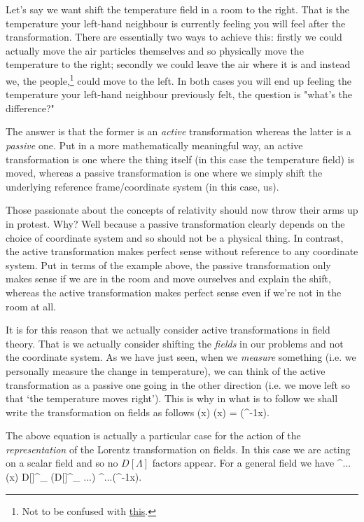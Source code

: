 Let's say we want shift the temperature field in a room to the right. That is the temperature your left-hand neighbour is currently feeling you will feel after the transformation. There are essentially two ways to achieve this: firstly we could actually move the air particles themselves and so physically move the temperature to the right; secondly we could leave the air where it is and instead we, the people,\footnote{Not to be confused with \href{https://en.wikipedia.org/wiki/We_the_People_(disambiguation)}{this}.} could move to the left. In both cases you will end up feeling the temperature your left-hand neighbour previously felt, the question is "what's the difference?" 

The answer is that the former is an \textit{active} transformation whereas the latter is a \textit{passive} one. Put in a more mathematically meaningful way, an active transformation is one where the thing itself (in this case the temperature field) is moved, whereas a passive transformation is one where we simply shift the underlying reference frame/coordinate system (in this case, us). 

Those passionate about the concepts of relativity should now throw their arms up in protest. Why? Well because a passive transformation clearly depends on the choice of coordinate system and so should not be a physical thing. In contrast, the active transformation makes perfect sense without reference to any coordinate system. Put in terms of the example above, the passive transformation only makes sense if we are in the room and move ourselves and explain the shift, whereas the active transformation makes perfect sense even if we're not in the room at all. 

It is for this reason that we actually consider active transformations in field theory. That is we actually consider shifting the \textit{fields} in our problems and not the coordinate system. As we have just seen, when we \textit{measure} something (i.e. we personally measure the change in temperature), we can think of the active transformation as a passive one going in the other direction (i.e. we move left so that `the temperature moves right'). This is why in what is to follow we shall write the transformation on fields as follows
\be 
\label{eqn:ActiveFieldTransformation}
    \phi(x) \longrightarrow \widetilde{\phi}(x) = \phi\big(\Lambda^{-1}x\big).
\ee 

The above equation is actually a particular case for the action of the \textit{representation} of the Lorentz transformation on fields. In this case we are acting on a scalar field and so no $D[\Lambda]$ factors appear. For a general field we have 
\bse 
    \phi^{\mu\nu...}(x) \longrightarrow D[\Lambda]^{\mu}_{\sig} \big(D[\Lambda]^{\nu}_{\tau} ...\big) \phi^{\sig\tau...}\big(\Lambda^{-1}x\big).
\ese 

